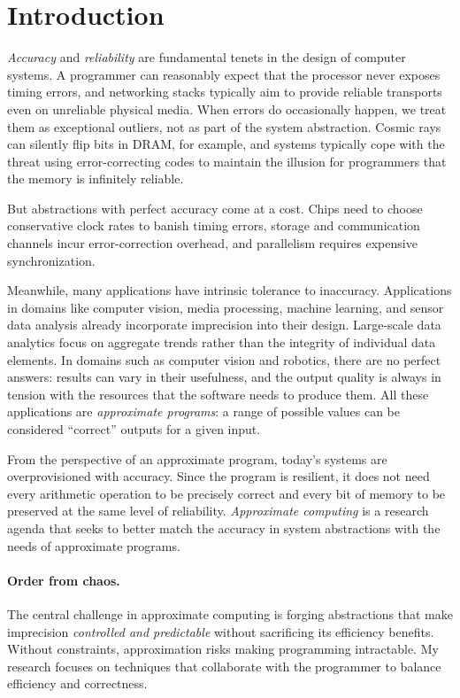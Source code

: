\section{Introduction}
\label{sec:intro}

\emph{Accuracy} and \emph{reliability} are fundamental tenets in the design of
computer systems.
A
programmer can reasonably expect that the processor never exposes timing
errors, and networking stacks typically aim to provide reliable transports
even on unreliable physical media.
When errors do occasionally happen, we treat them as exceptional outliers, not
as part of the system abstraction.
Cosmic rays can silently flip bits in DRAM, for example,
and systems typically cope with the threat using error-correcting codes to
maintain the illusion for programmers that the memory is infinitely reliable.

But abstractions with perfect accuracy come at a cost.
Chips need to choose conservative clock rates to banish timing errors,
storage and communication channels incur error-correction overhead,
and parallelism requires expensive synchronization.

Meanwhile, many applications have intrinsic tolerance to inaccuracy.
Applications in domains like computer vision, media
processing, machine learning, and sensor data analysis already incorporate
imprecision into their design.
Large-scale data analytics focus on aggregate trends rather than the integrity
of individual data elements.
In domains such as computer vision and robotics, there are no perfect answers:
results can vary in their usefulness, and the output quality is always in
tension with the resources that the software needs to produce them.
All these applications are \emph{approximate
programs}: a range of possible values can be considered ``correct'' outputs
for a given input.

From the perspective of an approximate program, today's
systems are overprovisioned with accuracy. Since the program is resilient, it
does
not need every arithmetic operation to be precisely correct and every bit of
memory to be preserved at the same level of reliability.
\emph{Approximate computing} is a research agenda that seeks to better match
the accuracy in system abstractions with the needs of approximate
programs.

\paragraph{Order from chaos.}
The central challenge in approximate computing is forging abstractions that
make imprecision \emph{controlled and predictable} without sacrificing its
efficiency benefits.
Without constraints, approximation risks making programming intractable.
My
research focuses on techniques that collaborate with the programmer to balance
efficiency and correctness.

